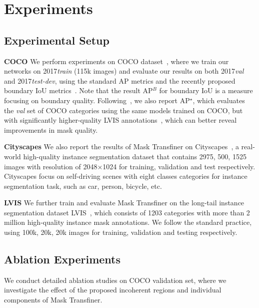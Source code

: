 \documentclass[10pt,twocolumn,letterpaper]{article}
\newcommand{\parsection}[1]{\vspace{1mm}\noindent\textbf{#1}}
\begin{document}
\section{Experiments}

\subsection{Experimental Setup}

\parsection{COCO}
We perform experiments on COCO dataset~\cite{lin2014microsoft}, where we train our networks on 2017{\it train} (115k images) and evaluate our results on both 2017{\it val} and 2017{\it test-dev}, using the standard AP metrics and the recently proposed boundary IoU metrics~\cite{cheng2021boundary}. Note that the result AP$^{B}$ for boundary IoU is a measure focusing on boundary quality. Following~\cite{kirillov2020pointrend}, we also report AP$^\star$, which evaluates the \textit{val} set of COCO categories using the same models trained on COCO, but with significantly higher-quality LVIS annotations~\cite{gupta2019lvis}, which can better reveal improvements in mask quality.

\parsection{Cityscapes} We also report the results of Mask Transfiner on Cityscapes~\cite{cordts2016cityscapes}, a real-world high-quality instance segmentation dataset that contains 2975, 500, 1525 images with resolution of 2048×1024 for training, validation and test respectively. Cityscapes focus on self-driving scenes with eight classes categories for instance segmentation task, such as car, person, bicycle, etc.

\parsection{LVIS} We further train and evaluate Mask Transfiner on the long-tail instance segmentation dataset LVIS~\cite{gupta2019lvis}, which consists of 1203 categories with more than 2 million high-quality instance mask annotations. We follow the standard practice, using 100k, 20k, 20k images for training, validation and testing respectively.


\subsection{Ablation Experiments}

We conduct detailed ablation studies on COCO validation set, where we investigate the effect of the proposed incoherent regions and individual components of Mask Transfiner.
\end{document}

